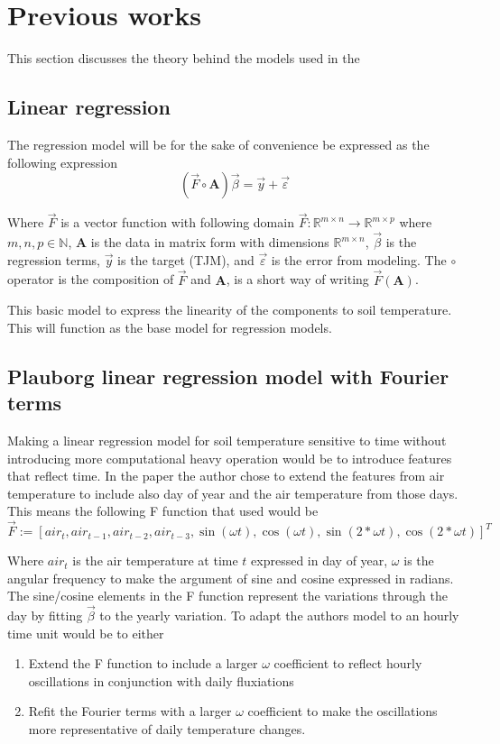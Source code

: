 \section{Previous works}\label{sec:theory}

This section discusses the theory behind the models used in the 

\subsection{Linear regression}

The regression model will be for the sake of convenience be expressed as the following expression
$$
\left(\vec{F}\circ \mathbf{A}\right)\vec{\beta}=\vec{y}+\vec{\varepsilon}
$$

Where $\vec{F}$ is a vector function with following domain $\vec{F}:\mathbb{R}^{m\times n}\to \mathbb{R}^{m\times p}$ where $m,n,p\in \mathbb{N}$, $\mathbf{A}$ is the data in matrix form with dimensions $\mathbb{R}^{m\times n}$, $\vec{\beta}$ is the regression terms, $\vec{y}$ is the target (TJM), and $\vec{\varepsilon}$ is the error from modeling. The $\circ$ operator is the composition of $\vec{F}$ and $\mathbf{A}$, is a short way of writing $\vec{F}(\mathbf{A})$.

This basic model to express the linearity of the components to soil temperature. This will function as the base model for regression models. 

\subsection[Plauborg Regression]{Plauborg linear regression model with Fourier terms}

Making a linear regression model for soil temperature sensitive to time without introducing more computational heavy operation would be to introduce features that reflect time. In the paper  the author chose to extend the features from air temperature to include also day of year and the air temperature from those days. This means the following F function that \citeauthor{plauborg_simple_2002} used would be 
$$
\vec{F} := [air_t , air_{t-1}, air_{t-2}, air_{t-3}, \sin(\omega t) , \cos(\omega t), \sin(2*\omega t), \cos(2*\omega t)]^T
$$

Where $air_t$ is the air temperature at time $t$ expressed in day of year, $\omega$ is the angular frequency to make the argument of sine and cosine expressed in radians. The sine/cosine elements in the F function represent the variations through the day by fitting $\vec{\beta}$ to the yearly variation. To adapt the authors model to an hourly time unit would be to either
\begin{enumerate}
	\item Extend the F function to include a larger $\omega$ coefficient to reflect hourly oscillations in conjunction with daily fluxiations
	\item Refit the Fourier terms with a larger $\omega$ coefficient to make the oscillations more representative of daily temperature changes.
\end{enumerate}

